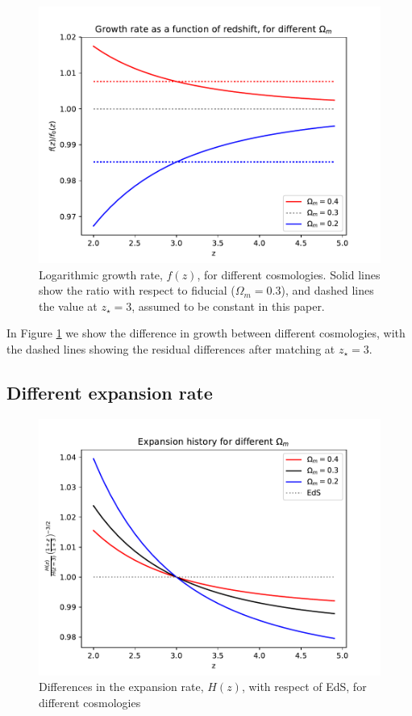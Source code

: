 \begin{figure}[ht]
 \begin{center}
  \includegraphics[scale=0.7]{Figures/fz_omega_m}
 \end{center}
 \caption{Logarithmic growth rate, $f(z)$, for different cosmologies.
  Solid lines show the ratio with respect to fiducial ($\Omega_m=0.3$), 
  and dashed lines the value at $z_\star=3$, assumed to be constant in this 
  paper.}
 \label{fig:fz_Om}
\end{figure}

In Figure \ref{fig:fz_Om} we show the difference in growth between different
cosmologies, with the dashed lines showing the residual differences after 
matching at $z_\star=3$.


\subsection{Different expansion rate}

\begin{figure}[ht]
 \begin{center}
  \includegraphics[scale=0.7]{Figures/Hz3_omega_m}
 \end{center}
 \caption{Differences in the expansion rate, $H(z)$, with respect of EdS, 
  for different cosmologies}
 \label{fig:Hz_Om}
\end{figure}

